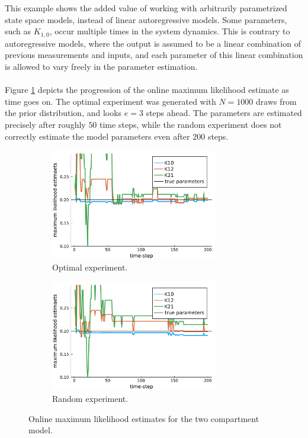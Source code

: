 \\
\\
This example shows the added value of working with arbitrarily parametrized state space models, instead of linear autoregressive models. Some parameters, such as $K_{1,0}$, occur multiple times in the system dynamics. This is contrary to autoregressive models, where the output is assumed to be a linear combination of previous measurements and inputs, and each parameter of this linear combination is allowed to vary freely in the parameter estimation.
\\
\\
Figure \ref{figOnline2} depicts the progression of the online maximum likelihood estimate as time goes on. The optimal experiment was generated with $N=1000$ draws from the prior distribution, and looks $e=3$ steps ahead. The parameters are estimated precisely after roughly $50$ time steps, while the random experiment does not correctly estimate the model parameters even after $200$ steps.
\begin{figure}[H]
	\begin{subfigure}[b]{0.45\textwidth}
		\includegraphics[width=0.8\textwidth]{figure/paper 3/online estimate2opt}
		\caption{Optimal experiment.}
	\end{subfigure}
	\begin{subfigure}[b]{0.45\textwidth}
		\includegraphics[width=0.8\textwidth]{figure/paper 3/online estimate2rand}
		\caption{Random experiment.}
	\end{subfigure}
	\caption{Online maximum likelihood estimates for the two compartment model.}
	\label{figOnline2}
\end{figure}
